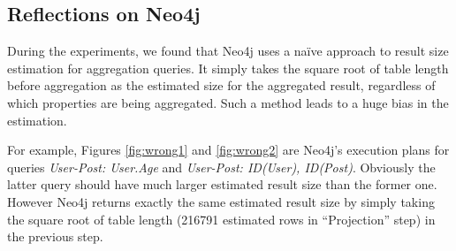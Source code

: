 \subsection{Reflections on Neo4j}
During the experiments, we found that Neo4j uses a na\"ive approach to result size estimation for aggregation queries. It simply takes the square root of table length before aggregation as the estimated size for the aggregated result, regardless of which properties are being aggregated. Such a method leads to a huge bias in the estimation.

For example, Figures \ref{fig:wrong1} and \ref{fig:wrong2} are Neo4j's execution plans for queries \textit{User-Post: User.Age} and \textit{User-Post: ID(User), ID(Post)}. Obviously the latter query should have much larger estimated result size than the former one. However Neo4j returns exactly the same estimated result size by simply taking the square root of table length (216791 estimated rows in ``Projection'' step) in the previous step.


